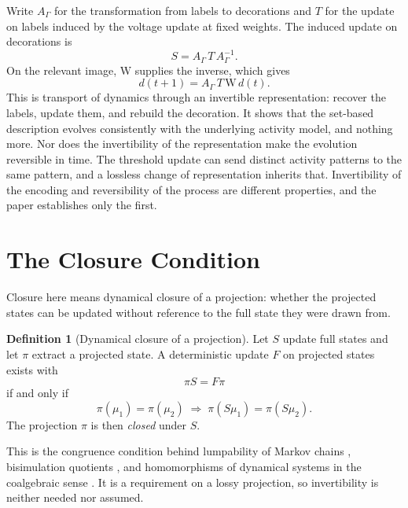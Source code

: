 \documentclass[11pt, a4paper]{article}
\theoremstyle{plain}
\theoremstyle{definition}
\newtheorem{definition}[theorem]{Definition}
\theoremstyle{remark}
\newcommand{\lift}{\mathrm{W}}
\begin{document}
Write $A_\Gamma$ for the transformation from labels to decorations and $T$ for the update on labels induced by the voltage update at fixed weights. The induced update on decorations is
\[
S = A_\Gamma \, T \, A_\Gamma^{-1}.
\]
On the relevant image, $\lift$ supplies the inverse, which gives
\[
d(t+1) = A_\Gamma \, T \, \lift\, d(t).
\]
This is transport of dynamics through an invertible representation: recover the labels, update them, and rebuild the decoration. It shows that the set-based description evolves consistently with the underlying activity model, and nothing more. Nor does the invertibility of the representation make the evolution reversible in time. The threshold update can send distinct activity patterns to the same pattern, and a lossless change of representation inherits that. Invertibility of the encoding and reversibility of the process are different properties, and the paper establishes only the first.

\section{The Closure Condition}\label{sec:closure}

Closure here means dynamical closure of a projection: whether the projected states can be updated without reference to the full state they were drawn from.

\begin{definition}[Dynamical closure of a projection]
Let $S$ update full states and let $\pi$ extract a projected state. A deterministic update $F$ on projected states exists with
\[
\pi S = F\pi
\]
if and only if
\[
\pi(\mu_1) = \pi(\mu_2) \;\Longrightarrow\; \pi(S\mu_1) = \pi(S\mu_2).
\]
The projection $\pi$ is then \emph{closed} under $S$.
\end{definition}

This is the congruence condition behind lumpability of Markov chains \cite{kemeny1960}, bisimulation quotients \cite{park1981}, and homomorphisms of dynamical systems in the coalgebraic sense \cite{rutten2000}. It is a requirement on a lossy projection, so invertibility is neither needed nor assumed.
\end{document}
